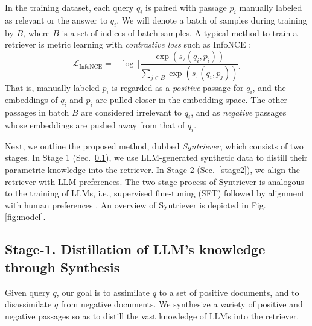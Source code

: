 In the training dataset, each query $q_i$ is paired with passage $p_i$ manually labeled as relevant or the answer to $q_i$. We will denote a batch of samples during training by $B$, where $B$ is a set of indices of batch samples. A typical method to train a retriever is metric learning with \emph{contrastive loss} such as InfoNCE \cite{oord2018representation, izacard2021unsupervised}:
\[
\mathcal{L}_\text{InfoNCE}=-\log\,\bigg[\frac{\exp(s_\tau(q_i,p_i))}{\sum\limits_{j\in B}\exp(s_\tau(q_i,p_j))}\bigg]
\]
That is, manually labeled $p_i$ is regarded as a \emph{positive} passage for $q_i$, and the embeddings of $q_i$ and $p_i$ are pulled closer in the embedding space. The other passages in batch $B$ are considered irrelevant to $q_i$, and as \emph{negative} passages whose embeddings are pushed away from that of $q_i$.

Next, we outline the proposed method, dubbed \emph{Syntriever}, which consists of two stages. In Stage 1 (Sec.\ \ref{stage1}), we use LLM-generated synthetic data to distill their parametric knowledge into the retriever. In Stage 2 (Sec.\ \ref{stage2}), we align the retriever with  LLM preferences. The two-stage process of Syntriever is analogous to the training of LLMs, i.e., supervised fine-tuning (SFT) followed by alignment with human preferences \cite{ouyang2022training}.  
An overview of Syntriever is depicted in Fig. \ref{fig:model}.



\subsection{Stage-1. Distillation of LLM's knowledge through Synthesis}\label{stage1}

Given query $q$, our goal is to assimilate  $q$ to a set of positive documents, and to disassimilate $q$ from negative documents. We synthesize a variety of positive and negative passages so as to distill the vast knowledge of LLMs into the retriever.

